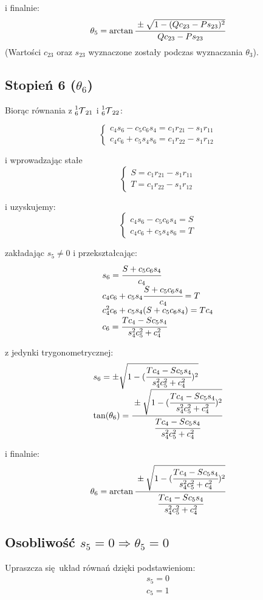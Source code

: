 \documentclass[]{article}
\newcommand\T{\mathcal{T}}
\begin{document}
i finalnie:
\[
\theta_5 = \arctan\cfrac{\pm \sqrt{1 - (Qc_{23} - Ps_{23})^2}}{Qc_{23} - Ps_{23}}
\]
(Wartości $c_{23}$ oraz $s_{23}$ wyznaczone zostały podczas wyznaczania $\theta_3$).

\subsection{Stopień 6 ($\theta_6$)}
Biorąc równania z $\prescript{1}{6}{\T}_{21}$ i $\prescript{1}{6}{\T}_{22}$:

\[\left\{\begin{array}{l}
c_4s_6 - c_5c_6s_4 = c_1r_{21} - s_1r_{11} \\
c_4c_6 + c_5s_4s_6 = c_1r_{22} - s_1r_{12}
\end{array}\right.\]

i wprowadzając stałe
\[\left\{\begin{array}{l}
S = c_1r_{21} - s_1r_{11} \\
T = c_1r_{22} - s_1r_{12}
\end{array}\right.\]

i uzyskujemy:
\[\left\{\begin{array}{l}
c_4s_6 - c_5c_6s_4 = S \\
c_4c_6 + c_5s_4s_6 = T
\end{array}\right.\]

zakładając $s_5 \neq 0$ i przekształcając:
\[\begin{array}{l}
s_6 = \cfrac{S + c_5c_6s_4}{c_4} \\
c_4c_6 + c_5s_4\cfrac{S + c_5c_6s_4}{c_4} = T \\
c_4^2c_6 + c_5s_4(S + c_5c_6s_4) = Tc_4 \\
c_6 = \cfrac{Tc_4 - Sc_5s_4}{s_4^2c_5^2 + c_4^2}
\end{array}\]

z jedynki trygonometrycznej:
\[\begin{array}{l}
s_6 = \pm \sqrt{1 - (\cfrac{Tc_4 - Sc_5s_4}{s_4^2c_5^2 + c_4^2})^2} \\
\tan(\theta_6) = \cfrac{\pm \sqrt{1 - (\cfrac{Tc_4 - Sc_5s_4}{s_4^2c_5^2 + c_4^2})^2}}{\cfrac{Tc_4 - Sc_5s_4}{s_4^2c_5^2 + c_4^2}}
\end{array}\]

i finalnie:
\[
\theta_6 = \arctan\cfrac{\pm \sqrt{1 - (\cfrac{Tc_4 - Sc_5s_4}{s_4^2c_5^2 + c_4^2})^2}}{\cfrac{Tc_4 - Sc_5s_4}{s_4^2c_5^2 + c_4^2}}
\]

\subsection{Osobliwość $s_5 = 0 \Rightarrow \theta_5 = 0$}
Upraszcza się układ równań dzięki podstawieniom:
\[\begin{array}{l}
s_5 = 0 \\
c_5 = 1
\end{array}\]
\end{document}
